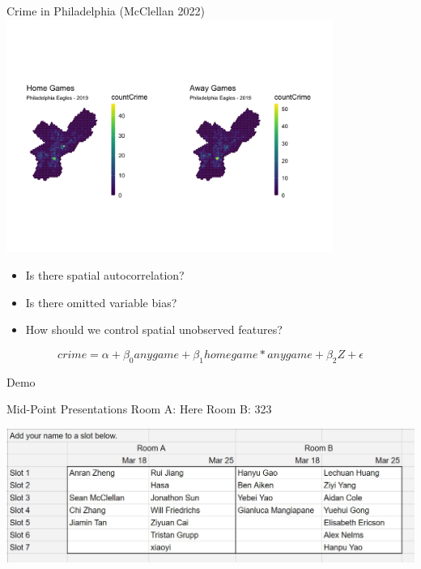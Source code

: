 \documentclass[
  8pt,
  ignorenonframetext,
]{beamer}
\providecommand{\tightlist}{%
  \setlength{\itemsep}{0pt}\setlength{\parskip}{0pt}}
\begin{document}
\begin{frame}{Crime in Philadelphia (McClellan 2022)}
\protect\hypertarget{crime-in-philadelphia-mcclellan-2022}{}
\includegraphics[width=0.8\textwidth,height=\textheight]{images/crime_plots.png}

\begin{itemize}
\tightlist
\item
  Is there spatial autocorrelation?
\item
  Is there omitted variable bias?
\item
  How should we control spatial unobserved features?
\end{itemize}

\pause

\[
crime = \alpha + \beta_0 anygame + \beta_1 homegame * anygame + \beta_2 Z + \epsilon
\]
\end{frame}

\begin{frame}{Demo}
\protect\hypertarget{demo}{}
\end{frame}

\begin{frame}{Mid-Point Presentations}
\protect\hypertarget{mid-point-presentations}{}
Room A: Here Room B: 323

\includegraphics{images/midpoint_schedule_20220325.jpg}
\end{frame}
\end{document}
